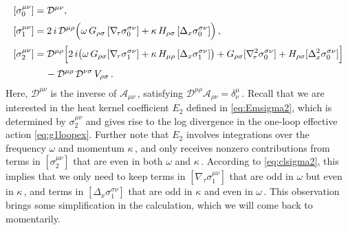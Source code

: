 \documentclass[11pt]{article}
\newcommand{\CA}{\mathcal{A}}
\newcommand{\CD}{\mathcal{D}}
\begin{document}
\begin{subequations}
\begin{align}
	[\sigma_0^{\mu\nu}] & = \CD^{\mu\nu}, \label{eq:sigma0cl} \\[2pt]
	[\sigma_1^{\mu\nu}] & = 2 \, i \, \CD^{\mu\rho} \Bigl( \omega \, G_{\rho\sigma} \, [\nabla_{\!\tau} \sigma_0^{\sigma\nu}] + \kappa \, H_{\rho\sigma} \, [\Delta_x \sigma_0^{\sigma\nu}] \Bigr)\,, \\[2pt]
	[\sigma_2^{\mu\nu}] & = \CD^{\mu\rho} \Bigl[2 \, i \bigl( \omega \, G_{\rho\sigma} [\nabla_{\!\tau} \sigma_1^{\sigma\nu}] + \kappa \, H_{\mu\rho} \, [\Delta_x \sigma_1^{\sigma\nu}] \bigr) + G_{\rho\sigma} [\nabla_{\!\tau}^2 \sigma_0^{\sigma\nu}] + H_{\rho\sigma} [\Delta_x^2 \sigma_0^{\sigma\nu}] \Bigr] \notag \\[2pt]
		& \quad\, - \CD^{\mu\rho} \, \CD^{\nu\sigma} \, V_{\rho\sigma}\,.  \label{eq:clsigma2}
\end{align}
\end{subequations}
%
Here, $\CD^{\mu\nu}$ is the inverse of $\CA_{\mu\nu}$\,, satisfying $\CD^{\mu\rho} \CA_{\rho\nu} = \delta^\mu_\nu$\,.
Recall that we are interested in the heat kernel coefficient $E_2$ defined in \eqref{eq:Emsigma2}, which is determined by $\sigma_2^{\mu\nu}$ and gives rise to the log divergence in the one-loop effective action \eqref{eq:g1loopex}. Further note that $E_2$ involves integrations over the frequency $\omega$ and momentum $\kappa$\,, and only receives nonzero contributions from terms in $[\sigma_2^{\mu\nu}]$ that are even in both $\omega$ and $\kappa$\,. According to \eqref{eq:clsigma2}, this implies that we only need to keep terms in $[\nabla_{\!\tau} \sigma_1^{\mu\nu}]$ that are odd in $\omega$ but even in $\kappa$\,, and terms in $[\Delta_x \sigma_1^{\sigma\nu}]$ that are odd in $\kappa$ and even in $\omega$\,. This observation brings some simplification in the calculation, which we will come back to momentarily. 
\end{document}

